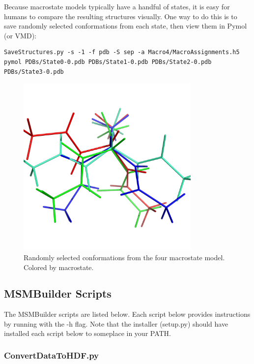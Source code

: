 \documentclass[12pt]{article}
\begin{document}
Because macrostate models typically have a handful of states, it is easy for humans to compare the resulting structures visually.  One way to do this 
is to save randomly selected conformations from each state, then view them in Pymol (or VMD):

\begin{verbatim}
SaveStructures.py -s -1 -f pdb -S sep -a Macro4/MacroAssignments.h5
pymol PDBs/State0-0.pdb PDBs/State1-0.pdb PDBs/State2-0.pdb PDBs/State3-0.pdb
\end{verbatim}

\begin{figure}
\begin{center}
\includegraphics[width=9.0cm]{figures/ala.png}
\caption{Randomly selected conformations from the four macrostate model.  Colored by macrostate.}
\end{center}
\end{figure}


\newpage

\subsection{MSMBuilder Scripts}

The MSMBuilder scripts are listed below.  Each script below provides instructions by running with the -h flag.  Note that the installer (setup.py) should have installed each script below to someplace in your PATH.  

\subsubsection{ConvertDataToHDF.py}
\end{document}
